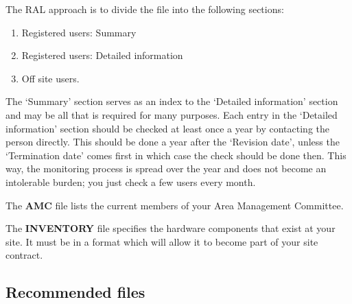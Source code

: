 The RAL approach is to divide the file into the following sections:
\begin{enumerate}
\item Registered users: Summary
\item Registered users: Detailed information
\item Off site users.
\end{enumerate}
The `Summary' section serves as an index to the `Detailed information' section
and may be all that is required for many purposes.
Each entry in the `Detailed information' section should be checked at least once
a year by contacting the person directly.
This should be done a year after the `Revision date', unless the `Termination
date' comes first in which case the check should be done then.
This way, the monitoring process is spread over the year and does not become an
intolerable burden; you just check a few users every month.

The {\bf AMC} file lists the current members of your Area Management Committee.

The {\bf INVENTORY} file specifies the hardware components that exist at your
site.
It must be in a format which will allow it to become part of your site contract.

\subsection {Recommended files}


